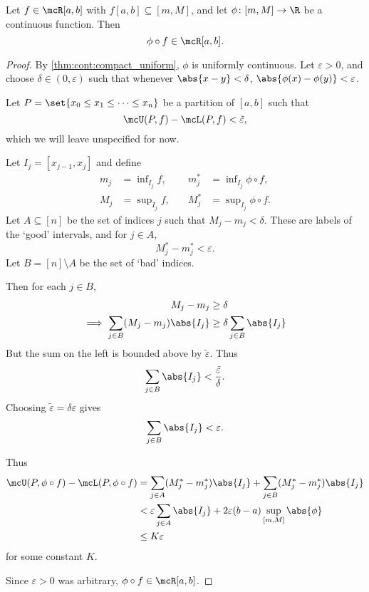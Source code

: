 \begin{theorem*}
    Let $f \in \mcR[a, b]$ with $f[a, b] \subseteq [m, M]$, and
    let $\phi\colon [m, M] \to \R$ be a continuous function.
    Then \[
        \phi \circ f \in \mcR[a, b].
    \]
\end{theorem*}
\begin{proof}
    By \cref{thm:cont:compact_uniform}, $\phi$ is uniformly continuous.
    Let $\varepsilon > 0$, and choose $\delta \in (0, \varepsilon)$
    such that whenever $\abs{x - y} < \delta$,
    $\abs{\phi(x) - \phi(y)} < \varepsilon$.

    Let $P = \set{x_0 \le x_1 \le \dots \le x_n}$ be a partition of $[a, b]$
    such that \[
        \mcU(P, f) - \mcL(P, f) < \tilde{\varepsilon},
    \] which we will leave unspecified for now.

    Let $I_j = [x_{j-1}, x_j]$ and define \begin{align*}
        m_j &= \inf\nolimits_{I_j} f,
            &\quad m^*_j &= \inf\nolimits_{I_j} \phi \circ f, \\
        M_j &= \sup\nolimits_{I_j} f,
            &\quad M^*_j &= \sup\nolimits_{I_j} \phi \circ f.
    \end{align*}
    Let $A \subseteq [n]$ be the set of indices $j$ such that
    $M_j - m_j < \delta$.
    These are labels of the `good' intervals, and for $j \in A$, \[
        M^*_j - m^*_j < \varepsilon.
    \] Let $B = [n] \setminus A$ be the set of `bad' indices.

    Then for each $j \in B$, \begin{align*}
        M_j - m_j &\ge \delta \\
        \implies \sum_{j \in B} (M_j - m_j) \abs{I_j}
            &\ge \delta \sum_{j \in B} \abs{I_j}
    \end{align*}
    But the sum on the left is bounded above by $\tilde{\varepsilon}$.
    Thus \[
        \sum_{j \in B} \abs{I_j} < \frac{\tilde{\varepsilon}}{\delta}.
    \] Choosing $\tilde{\varepsilon} = \delta \varepsilon$ gives \[
        \sum_{j \in B} \abs{I_j} < \varepsilon.
    \]

    Thus \begin{align*}
        \mcU(P, \phi \circ f) - \mcL(P, \phi \circ f)
            &= \sum_{j \in A} (M^*_j - m^*_j) \abs{I_j}
                + \sum_{j \in B} (M^*_j - m^*_j) \abs{I_j} \\
            &< \varepsilon \sum_{j \in A} \abs{I_j}
                + 2 \varepsilon (b - a) \sup_{[m, M]} \abs{\phi} \\
            &\le K \varepsilon
    \end{align*} for some constant $K$.

    Since $\varepsilon > 0$ was arbitrary, $\phi \circ f \in \mcR[a, b]$.
\end{proof}
